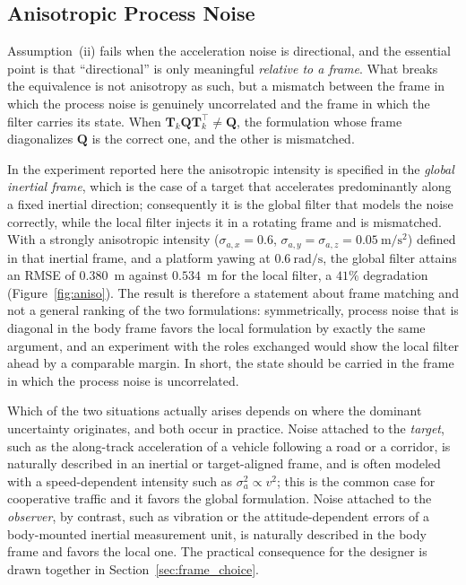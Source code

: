 \subsection{Anisotropic Process Noise}

Assumption~(ii) fails when the acceleration noise is directional, and the
essential point is that ``directional'' is only meaningful \emph{relative to a
frame}. What breaks the equivalence is not anisotropy as such, but a mismatch
between the frame in which the process noise is genuinely uncorrelated and the
frame in which the filter carries its state. When
$\bm{T}_k\bm{Q}\bm{T}_k^{\top}\neq\bm{Q}$, the formulation whose frame
diagonalizes $\bm{Q}$ is the correct one, and the other is mismatched.

In the experiment reported here the anisotropic intensity is specified in the
\emph{global inertial frame}, which is the case of a target that accelerates
predominantly along a fixed inertial direction; consequently it is the global
filter that models the noise correctly, while the local filter injects it in a
rotating frame and is mismatched. With a strongly anisotropic intensity
($\sigma_{a,x}=0.6$, $\sigma_{a,y}=\sigma_{a,z}=0.05~\mathrm{m/s^2}$) defined in
that inertial frame, and a platform yawing at $0.6~\mathrm{rad/s}$, the global
filter attains an RMSE of $0.380$~m against $0.534$~m for the local filter, a
$41\%$ degradation (Figure~\ref{fig:aniso}). The result is therefore a statement
about frame matching and not a general ranking of the two formulations:
symmetrically, process noise that is diagonal in the body frame favors the local
formulation by exactly the same argument, and an experiment with the roles
exchanged would show the local filter ahead by a comparable margin. In short, the
state should be carried in the frame in which the process noise is uncorrelated.

Which of the two situations actually arises depends on where the dominant
uncertainty originates, and both occur in practice. Noise attached to the
\emph{target}, such as the along-track acceleration of a vehicle following a
road or a corridor, is naturally described in an inertial or target-aligned frame,
and is often modeled with a speed-dependent intensity such as
$\sigma_a^2\propto v^2$; this is the common case for cooperative traffic and it
favors the global formulation. Noise attached to the \emph{observer}, by contrast,
such as vibration or the attitude-dependent errors of a body-mounted inertial
measurement unit, is naturally described in the body frame and favors the local
one. The practical consequence for the designer is drawn together in
Section~\ref{sec:frame_choice}.


